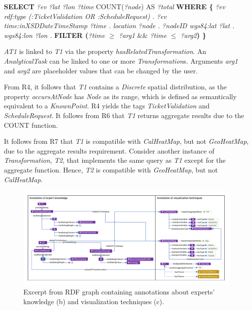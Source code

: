 \documentclass[]{interact}
\theoremstyle{plain}%
\theoremstyle{definition}
\theoremstyle{remark}
\theoremstyle{definition}
\begin{document}
\begin{algorithmic}
  
 \label{alg:transformation1}

  \STATE \textbf{SELECT} \textit{?ev ?lat ?lon ?time} COUNT(\textit{?node}) AS \textit{?total}
  \STATE \textbf{WHERE \{}
  \STATE \hspace{5mm} \textit{?ev rdf:type (:TicketValidation OR :ScheduleRequest) .}
  \STATE \hspace{5mm} \textit{?ev time:inXSDDateTimeStamp ?time .}
  \STATE \hspace{11mm} \textit{location ?node .}
  \STATE \hspace{5mm} \textit{?nodeID wgs84:lat ?lat .}
  \STATE \hspace{18mm} \textit{wgs84:lon ?lon .}
  \STATE \hspace{5mm} \textbf{FILTER (}\textit{?time $\geq$ ?arg1} \&\& \textit{?time $\leq$ ?arg2}\textbf{) \}}
\end{algorithmic}

\textit{AT1} is linked to \textit{T1} via the property \textit{hasRelatedTransformation}. An \textit{AnalyticalTask} can be linked to one or more \textit{Transformation}s. Arguments \textit{arg1} and \textit{arg2} are placeholder values that can be changed by the user.

From R4, it follows that \textit{T1} contains a \textit{Discrete} spatial distribution, as the property \textit{occursAtNode} has \textit{Node} as its range, which is defined as semantically equivalent to a \textit{KnownPoint}. R4 yields the tags \textit{TicketValidation} and \textit{ScheduleRequest}. It follows from R6 that \textit{T1} returns aggregate results due to the COUNT function.

It follows from R7 that \textit{T1} is compatible with \textit{CalHeatMap}, but not \textit{GeoHeatMap}, due to the aggregate results requirement. Consider another instance of \textit{Transformation}, \textit{T2}, that implements the same query as \textit{T1} except for the aggregate function. Hence, \textit{T2} is compatible with \textit{GeoHeatMap}, but not \textit{CalHeatMap}.

\begin{figure}
\centering
\includegraphics[width=\textwidth]{images/vis_user2.pdf}
\caption{Excerpt from RDF graph containing annotations about experts' knowledge (b) and visualization techniques (c).}
\label{fig:vis_user}
\end{figure}
\end{document}
